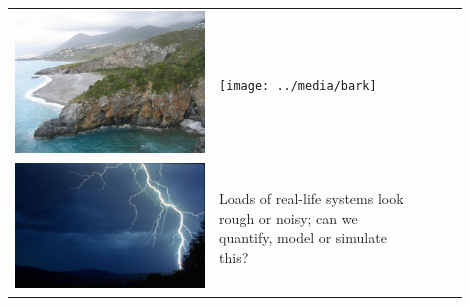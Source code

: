 \documentclass[12pt]{beamer}
\begin{document}
\begin{frame}
\begin{tabular}{m{0.45\linewidth}m{0.45\linewidth}l}
	 \includegraphics[width=\linewidth, height=0.25\paperheight]{../media/coastline}
	&\texttt{[image: ../media/bark]}      &\\
	 \includegraphics[width=\linewidth, height=0.25\paperheight]{../media/lightning}
	&Loads of real-life systems look rough or noisy; can we quantify, model or simulate this?
\end{tabular}
\end{frame}
\end{document}
